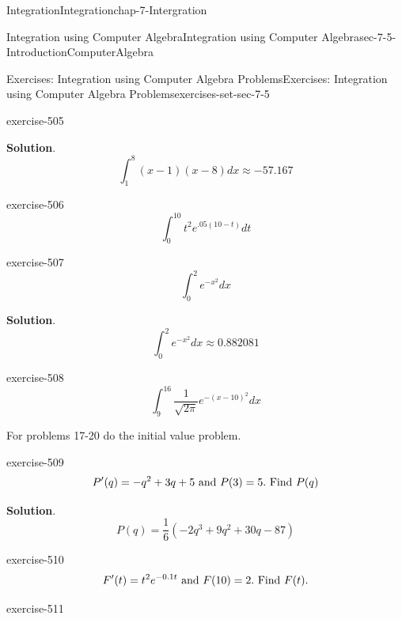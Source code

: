 \documentclass[oneside,10pt,]{book}
\numberwithin{equation}{section}
\begin{document}
\begin{chapterptx}{Integration}{}{Integration}{}{}{chap-7-Intergration}
\begin{sectionptx}{Integration using Computer Algebra}{}{Integration using Computer Algebra}{}{}{sec-7-5-IntroductionComputerAlgebra}
\begin{exercises-subsection-numberless}{Exercises: Integration using Computer Algebra Problems}{}{Exercises: Integration using Computer Algebra Problems}{}{}{exercises-set-sec-7-5}
\begin{divisionexercise}{13}{}{}{exercise-505}
\begin{equation*}
\end{equation*}
\par\smallskip%
\noindent\textbf{Solution}.\hypertarget{solution-256}{}\quad%
%
\begin{equation*}
\int_1^8(x-1)(x-8)  dx \approx -57.167
\end{equation*}
\end{divisionexercise}%
\begin{divisionexercise}{14}{}{}{exercise-506}%
%
\begin{equation*}
\int_0^{10}t^2 e^{.05(10-t)}  dt 
\end{equation*}
\end{divisionexercise}%
\begin{divisionexercise}{15}{}{}{exercise-507}%
%
\begin{equation*}
\int_0^2 e^{-x^2} dx
\end{equation*}
\par\smallskip%
\noindent\textbf{Solution}.\hypertarget{solution-257}{}\quad%
%
\begin{equation*}
\int_0^2 e^{-x^2} dx \approx 0.882081
\end{equation*}
\end{divisionexercise}%
\begin{divisionexercise}{16}{}{}{exercise-508}%
%
\begin{equation*}
\int_9^{16} \frac{1}{\sqrt{2\pi}} e^{-(x-10)^2}  dx 
\end{equation*}
\end{divisionexercise}%
\hypertarget{p-2919}{}%
For problems 17-20 do the initial value problem.%
\begin{divisionexercise}{17}{}{}{exercise-509}%
%
\begin{equation*}
P' (q)=-q^2+3q+5\hbox{ and }P(3)=5.\hbox{ Find } P(q)
\end{equation*}
\par\smallskip%
\noindent\textbf{Solution}.\hypertarget{solution-258}{}\quad%
%
\begin{equation*}
P(q)=\frac{1}{6} (-2q^3+9q^2+30q-87)
\end{equation*}
\end{divisionexercise}%
\begin{divisionexercise}{18}{}{}{exercise-510}%
%
\begin{equation*}
F' (t)=t^2 e^{-0.1t} \hbox{ and } F(10)=2.  \hbox{ Find } F(t).
\end{equation*}
\end{divisionexercise}%
\begin{divisionexercise}{19}{}{}{exercise-511}%

\end{divisionexercise}
\end{exercises-subsection-numberless}
\end{sectionptx}
\end{chapterptx}
\end{document}
